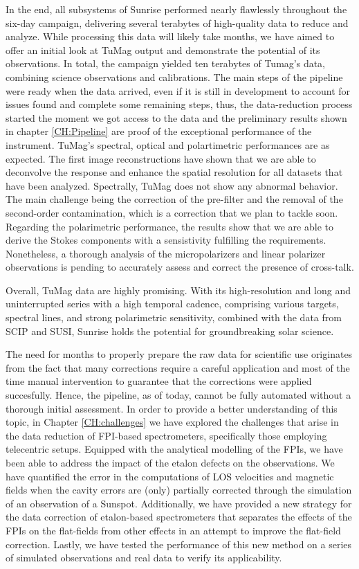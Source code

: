 In the end, all subsystems of Sunrise performed nearly flawlessly throughout the six-day campaign, delivering several terabytes of high-quality data to reduce and analyze. While processing this data will likely take months, we have aimed to offer an initial look at TuMag output and demonstrate the potential of its observations. In total, the campaign yielded ten terabytes of Tumag's data, combining science observations and calibrations. The main steps of the pipeline were ready when the data arrived, even if it is still in development to account for issues found and complete some remaining steps, thus, the data-reduction process started the moment we got access to the data and the preliminary results shown in chapter \ref{CH:Pipeline} are proof of the exceptional performance of the instrument. TuMag's spectral, optical and polartimetric performances are as expected. The first image reconstructions have shown that we are able to deconvolve the response and enhance the spatial resolution for all datasets that have been analyzed. Spectrally, TuMag does not show any abnormal behavior. The main challenge being the correction of the pre-filter and the removal of the second-order contamination, which is a correction that we plan to tackle soon. Regarding the polarimetric performance, the results show that we are able to derive the Stokes components with a sensistivity fulfilling the requirements. Nonetheless, a thorough analysis of the micropolarizers and linear polarizer observations is pending to accurately assess and correct the presence of cross-talk.

Overall, TuMag data are highly promising. With its high-resolution and long and uninterrupted series with a high temporal cadence, comprising various targets, spectral lines, and strong polarimetric sensitivity, combined with the data from SCIP and SUSI, Sunrise holds the potential for groundbreaking solar science. 

The need for months to properly prepare the raw data for scientific use originates from the fact that many corrections require a careful application and most of the time manual intervention to guarantee that the corrections were applied succesfully. Hence, the pipeline, as of today, cannot be fully automated without a thorough initial assessment. In order to provide a better understanding of this topic, in Chapter \ref{CH:challenges} we have explored the challenges that arise in the data reduction of FPI-based spectrometers, specifically those employing telecentric setups. Equipped with the analytical modelling of the FPIs, we have been able to address the impact of the etalon defects on the observations. We have quantified the error in the computations of LOS velocities and magnetic fields when the cavity errors are (only) partially corrected through the simulation of an observation of a Sunspot. Additionally, we have provided a new strategy for the data correction of etalon-based spectrometers that separates the effects of the FPIs on the flat-fields from other effects in an attempt to improve the flat-field correction. Lastly, we have tested the performance of this new method on a series of simulated observations and real data to verify its applicability. 

